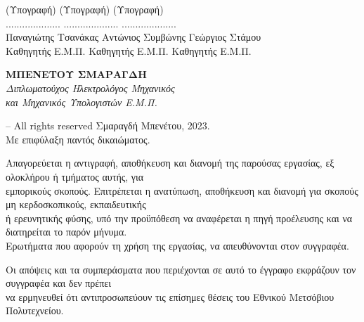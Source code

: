 \documentclass[12pt]{article}
\begin{document}
\begin{center}
\vspace{2cm}

(Υπογραφή) (Υπογραφή) (Υπογραφή)\\
\vspace{0.8 cm} 
.................... .................... ....................\\
Παναγιώτης Τσανάκας Αντώνιος Συμβώνης Γεώργιος Στάμου \\
Καθηγητής Ε.Μ.Π. Καθηγητής Ε.Μ.Π. Καθηγητής Ε.Μ.Π. 	
\vspace{3.5 cm} 






\end{center}

\newpage
\mbox{}
\newpage

\vspace*{\fill}
\begin{center}
    \textbf{\Large ΜΠΕΝΕΤΟΥ ΣΜΑΡΑΓΔΗ}\\[10pt]
    \textit{Διπλωματούχος Ηλεκτρολόγος Μηχανικός\\
    και Μηχανικός Υπολογιστών Ε.Μ.Π.}
\end{center}
\vspace*{\fill}

\vspace{2cm}

\noindent \textcopyright{} -- All rights reserved \hfill Σμαραγδή Μπενέτου, 2023.\\
Με επιφύλαξη παντός δικαιώματος.

\vspace{1cm}

\noindent Απαγορεύεται η αντιγραφή, αποθήκευση και διανομή της παρούσας εργασίας, εξ ολοκλήρου ή τμήματος αυτής, για\\
εμπορικούς σκοπούς. Επιτρέπεται η ανατύπωση, αποθήκευση και διανομή για σκοπούς μη κερδοσκοπικούς, εκπαιδευτικής\\
ή ερευνητικής φύσης, υπό την προϋπόθεση να αναφέρεται η πηγή προέλευσης και να διατηρείται το παρόν μήνυμα.\\
Ερωτήματα που αφορούν τη χρήση της εργασίας, να απευθύνονται στον συγγραφέα.

\vspace{1cm}

\noindent Οι απόψεις και τα συμπεράσματα που περιέχονται σε αυτό το έγγραφο εκφράζουν τον συγγραφέα και δεν πρέπει\\
να ερμηνευθεί ότι αντιπροσωπεύουν τις επίσημες θέσεις του Εθνικού Μετσόβιου Πολυτεχνείου.
\end{document}
